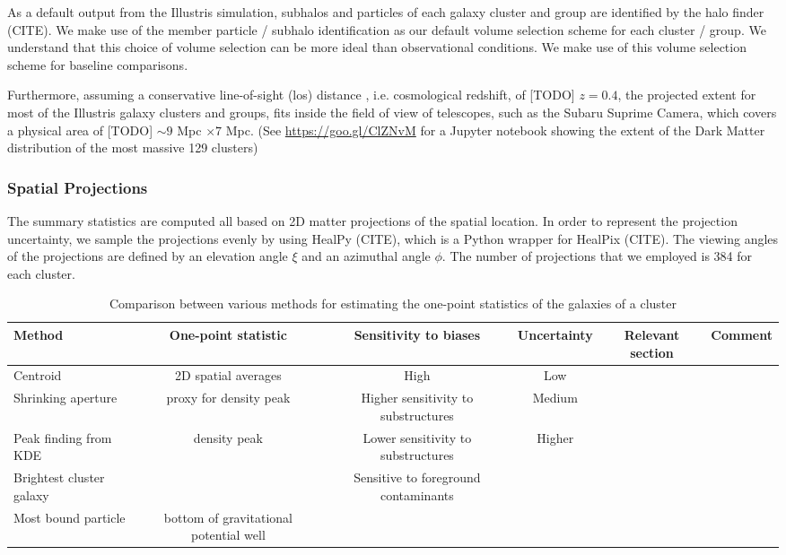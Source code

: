 As a default output from the Illustris simulation, subhalos and particles of
each galaxy cluster and group are identified by the halo finder
(CITE). We make use of the member particle / subhalo identification as our
default volume selection scheme for each cluster / group.
We understand that this choice of volume selection can be more ideal than
observational conditions. We make use of this volume selection scheme
for baseline comparisons. 

Furthermore, assuming a conservative line-of-sight (los) distance 
, i.e. cosmological redshift, of [TODO] $z = 0.4$, 
the projected extent for most of the Illustris galaxy clusters and groups, 
fits inside the field of view of telescopes, such as the Subaru Suprime Camera,
which covers a physical area of [TODO] $\sim 9$ Mpc $\times 7$ Mpc. 
(See \href{https://goo.gl/ClZNvM}{https://goo.gl/ClZNvM} for a Jupyter notebook 
showing the extent of the Dark Matter distribution of the most massive 129 clusters)



\subsubsection{Spatial Projections}
The summary statistics are computed all based on 2D matter projections of the
spatial location.
In order to represent the projection uncertainty, we sample the projections evenly
by using HealPy (CITE), which is a Python wrapper for HealPix (CITE).
The viewing angles of the projections are defined by an elevation angle
$\xi$ and an azimuthal angle $\phi$. 
The number of projections that we employed is 384 for each cluster.

\begin{table*}
\begin{center}
\begin{minipage}{180mm} 
	\caption{Comparison between various methods for estimating the one-point
		statistics of the galaxies of a cluster 
\label{tab:centroid_comparison}} 
	\begin{tabular}{@{}lccccc@{}}
\hline 
Method &  One-point statistic & Sensitivity to biases & Uncertainty  & Relevant
section & Comment  \\ \hline
Centroid & 2D spatial averages & High & Low & \\
Shrinking aperture & proxy for density peak & Higher sensitivity to substructures & Medium
& \\
Peak finding from KDE & density peak & Lower sensitivity to substructures &
Higher & \\
Brightest cluster galaxy & & Sensitive to foreground contaminants & \\ 
Most bound particle & bottom of gravitational potential well &  & 
&  \\
\hline
\end{tabular} 
\label{tab:summary_stat_info} 
\end{minipage}
\end{center} 
\end{table*}

